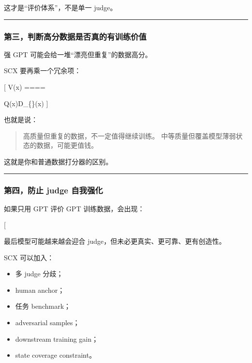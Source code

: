 \documentclass[
  12pt,
]{ctexart}
\providecommand{\tightlist}{%
  \setlength{\itemsep}{0pt}\setlength{\parskip}{0pt}}
\begin{document}
这才是``评价体系''，不是单一 judge。

\begin{center}\rule{0.5\linewidth}{0.5pt}\end{center}

\subsubsection{第三，判断高分数据是否真的有训练价值}\label{ux7b2cux4e09ux5224ux65adux9ad8ux5206ux6570ux636eux662fux5426ux771fux7684ux6709ux8badux7ec3ux4ef7ux503c}

强 GPT 可能会给一堆``漂亮但重复''的数据高分。

SCX 要再乘一个冗余项：

{[} V(x) ====

Q(x)\cdot D\_\{\}(x) {]}

也就是说：

\begin{quote}
高质量但重复的数据，不一定值得继续训练。
中等质量但覆盖模型薄弱状态的数据，可能更值钱。
\end{quote}

这就是你和普通数据打分器的区别。

\begin{center}\rule{0.5\linewidth}{0.5pt}\end{center}

\subsubsection{第四，防止 judge
自我强化}\label{ux7b2cux56dbux9632ux6b62-judge-ux81eaux6211ux5f3aux5316}

如果只用 GPT 评价 GPT 训练数据，会出现：

{[}  \rightarrow {} \rightarrow
\text{more GPT-like judge}{]}

最后模型可能越来越会迎合 judge，但未必更真实、更可靠、更有创造性。

SCX 可以加入：

\begin{itemize}
\tightlist
\item
  多 judge 分歧；
\item
  human anchor；
\item
  任务 benchmark；
\item
  adversarial samples；
\item
  downstream training gain；
\item
  state coverage constraint。
\end{itemize}
\end{document}

